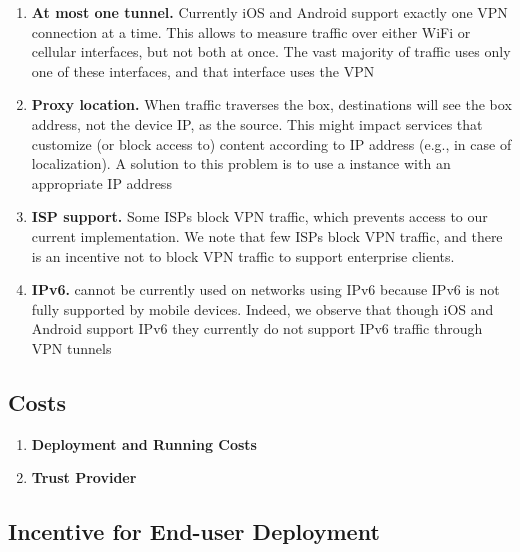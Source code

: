 \begin{enumerate}

\item \textbf{At most one tunnel.}
Currently iOS and Android support exactly one VPN connection at a time. 
This allows \platname{} to measure traffic over either WiFi or cellular interfaces, but not both at once.
The vast majority of traffic uses only one of these interfaces, and that interface uses the VPN

\item \textbf{Proxy location.} 
When traffic traverses the \platname{} box, destinations will see the \platname{} box address, not the device IP, as the source. 
This might impact services  that customize (or block access to) content according to IP address (e.g., in case of localization). 
A solution to this problem is to use a \platname{} instance with an appropriate IP address

\item \textbf{ISP support.}
Some ISPs block VPN traffic, which prevents access to our current \platname implementation. 
We note that few ISPs block VPN traffic, and there is an incentive not to block VPN traffic to support enterprise clients.

\item \textbf{IPv6.}
\platname{} cannot be currently used on networks using IPv6 because IPv6 is not fully supported by mobile devices. 
Indeed, we observe that though iOS and Android support IPv6 they currently do not support IPv6 traffic through VPN tunnels



\end{enumerate}

\subsection{Costs}

\begin{enumerate}

\item \textbf{Deployment and Running Costs}

\item \textbf{Trust Provider}

\end{enumerate}

\subsection{Incentive for End-user Deployment}

